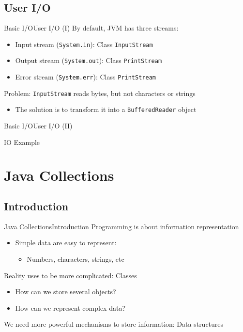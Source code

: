 \documentclass[10pt,compress]{beamer} %
\begin{document}
\subsection{User I/O}
\begin{frame}{Basic I/O}{User I/O (I)}
	By default, JVM has three streams:
		\begin{itemize}
		\item Input stream (\texttt{System.in}): Class \texttt{InputStream}
		\item Output stream (\texttt{System.out}): Class \texttt{PrintStream}
		\item Error stream (\texttt{System.err}): Class \texttt{PrintStream}
		\end{itemize}
	Problem: \texttt{InputStream} reads bytes, but not characters or strings
		\begin{itemize}
			\item The solution is to transform it into a \texttt{BufferedReader} object
		\end{itemize}
\end{frame}

\begin{frame}[shrink]{Basic I/O}{User I/O (II)}
	\vspace{-0.2cm}
	\begin{block}{IO Example}
	\vspace{-0.2cm}
		
	\vspace{-0.2cm}
	\end{block}
\end{frame}

\section{Java Collections}
\subsection{Introduction}
\begin{frame}{Java Collections}{Introduction}
	Programming is about information representation
	\begin{itemize}
		\item Simple data are easy to represent:
		\begin{itemize}
			\item Numbers, characters, strings, etc
		\end{itemize}
	\end{itemize}
	Reality uses to be more complicated: Classes
	\begin{itemize}
		\item How can we store several objects?
		\item How can we represent complex data?
	\end{itemize}
	We need more powerful mechanisms to store information: Data structures
\end{frame}
\end{document}
